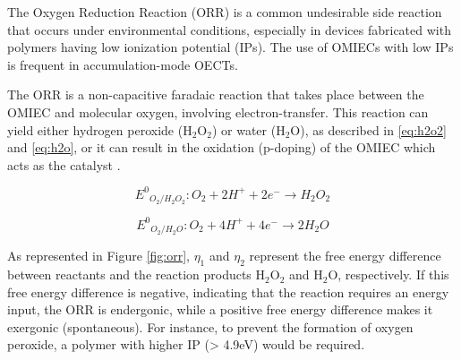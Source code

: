 The Oxygen Reduction Reaction (ORR) is a common undesirable side reaction that occurs under environmental conditions, especially in devices fabricated with polymers having low ionization potential (IPs). The use of OMIECs with low IPs is frequent in accumulation-mode OECTs. 



The ORR is a non-capacitive faradaic reaction that takes place between the OMIEC and molecular oxygen, involving electron-transfer. This reaction can yield either hydrogen peroxide (H$_{2}$O$_{2}$) or water (H$_{2}$O), as described in \ref{eq:h2o2} and \ref{eq:h2o}, or it can result in the oxidation (p-doping) of the OMIEC which acts as the catalyst \cite{giovannittiEnergeticControlRedoxActive2020}. 




\begin{equation}\label{eq:h2o2}
	{E^{0}}_{O_{2}/H_{2}O_{2}} : O_{2} + 2H^{+} + 2e^{-} \rightarrow H_{2}O_{2}
\end{equation}

\begin{equation}\label{eq:h2o}
	{E^{0}}_{O_{2}/H_{2}O} : O_{2} + 4H^{+} + 4e^{-} \rightarrow 2H_{2}O
\end{equation}

As represented in Figure \ref{fig:orr}, $\eta_{1}$ and $\eta_{2}$ represent the free energy difference between reactants and the reaction products H$_{2}$O$_{2}$ and H$_{2}$O, respectively. If this free energy difference is negative, indicating that the reaction requires an energy input, the ORR is endergonic, while a positive free energy difference makes it exergonic (spontaneous). For instance, to prevent the formation of oxygen peroxide, a polymer with higher IP (> 4.9eV) would be required. 

